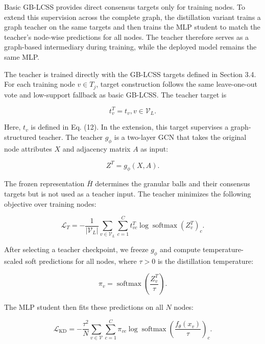 \documentclass[10pt,letterpaper]{elsarticle}
\begin{document}
Basic GB-LCSS provides direct consensus targets only for training nodes. To extend this supervision across the complete graph, the distillation variant trains a graph teacher on the same targets and then trains the MLP student to match the teacher's node-wise predictions for all nodes. The teacher therefore serves as a graph-based intermediary during training, while the deployed model remains the same MLP.

The teacher is trained directly with the GB-LCSS targets defined in Section 3.4. For each training node \(v \in T_{j}\), target construction follows the same leave-one-out vote and low-support fallback as basic GB-LCSS. The teacher target is

\begin{equation}\label{eq:14}
t_{v}^{T} = t_{v},v \in \mathcal{V}_{L}.
\end{equation}

Here, \(t_{v}\) is defined in Eq. (12). In the extension, this target supervises a graph-structured teacher. The teacher \(g_{\phi}\) is a two-layer GCN that takes the original node attributes \(X\) and adjacency matrix \(A\) as input:

\begin{equation}\label{eq:15}
Z^{T} = g_{\phi}(X,A).
\end{equation}

The frozen representation \(\bar{H}\) determines the granular balls and their consensus targets but is not used as a teacher input. The teacher minimizes the following objective over training nodes:

\begin{equation}\label{eq:16}
\mathcal{L}_{T} = - \frac{1}{|\mathcal{V}_{L}|}\sum_{v \in \mathcal{V}_{L}}{\sum_{c = 1}^{C}t_{vc}^{T}}\log\operatorname{softmax}\left( Z_{v}^{T} \right)_{c}.
\end{equation}

After selecting a teacher checkpoint, we freeze \(g_{\phi}\) and compute temperature-scaled soft predictions for all nodes, where \(\tau > 0\) is the distillation temperature:

\begin{equation}\label{eq:17}
\pi_{v} = \operatorname{softmax}\left( \frac{Z_{v}^{T}}{\tau} \right).
\end{equation}

The MLP student then fits these predictions on all \(N\) nodes:

\begin{equation}\label{eq:18}
\mathcal{L}_{\mathrm{KD}} = - \frac{\tau^{2}}{N}\sum_{v \in \mathcal{V}}{\sum_{c = 1}^{C}\pi_{vc}}\log\operatorname{softmax}\left( \frac{f_{\theta}(x_{v})}{\tau} \right)_{c}.
\end{equation}
\end{document}
